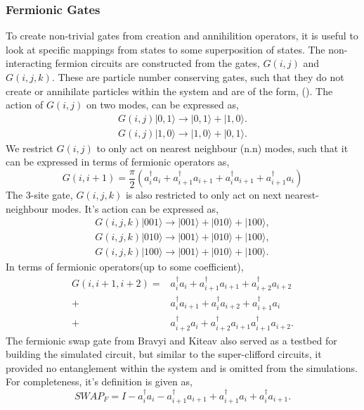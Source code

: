 \subsubsection{Fermionic Gates}
To create non-trivial gates from creation and annihilition operators, it is useful to look at specific mappings from states to some superposition of states. 
The non-interacting fermion circuits are constructed from the gates, $G(i, j)$ and $G(i, j, k)$. These are particle number conserving gates, such that they do not create or annihilate particles within the system and are of the form, (). The action of $G(i, j)$ on two modes, can be expressed as, 
\begin{align*}
    G(i, j) |0, 1 \rangle \to |0, 1\rangle + |1, 0\rangle. \\
    G(i, j) |1, 0 \rangle \to |1, 0\rangle + |0, 1\rangle.
\end{align*}
We restrict $G(i, j)$ to only act on nearest neighbour (n.n) modes, such that it can be expressed in terms of fermionic operators as,
\begin{equation}
    G(i, i+1) = \frac{\pi}{2}(a^{\dagger}_{i}a_{i} + a^{\dagger}_{i+1}a_{i+1} + a^{\dagger}_{i}a_{i+1} + a^{\dagger}_{i+1}a_{i})
\end{equation}
The 3-site gate, $G(i, j, k)$ is also restricted to only act on next nearest-neighbour modes. It's action can be expressed as, 
\begin{align*}
    G(i, j, k) |001\rangle\to |001\rangle + | 010\rangle + |100\rangle, \\
    G(i, j, k) |010\rangle\to |001\rangle + | 010\rangle + |100\rangle, \\
    G(i, j, k) |100\rangle\to |001\rangle + | 010\rangle + |100\rangle.
\end{align*}
In terms of fermionic operators(up to some coefficient), 
\begin{align*}
    G(i, i+1, i+2) = &a^{\dagger}_{i}a_{i} + a^{\dagger}_{i+1}a_{i+1} + a^{\dagger}_{i+2}a_{i+2} \\
    + &a^{\dagger}_{i}a_{i+1} +  a^{\dagger}_{i}a_{i+2} + a^{\dagger}_{i+1}a_{i}\\  + & a^{\dagger}_{i+2}a_{i} + a^{\dagger}_{i+2}a_{i+1} a^{\dagger}_{i+1}a_{i+2}. 
\end{align*}
The fermionic swap gate from Bravyi and Kiteav \cite{Bravyi2000} also served as a testbed for building the simulated circuit, but similar to the super-clifford circuits, it provided no entanglement within the system and is omitted from the simulations. For completeness, it's definition is given as, 
\begin{equation}
    SWAP_{F} = I - a^{\dagger}_{i}a_{i} - a^{\dagger}_{i+1}a_{i+1} + a^{\dagger}_{i+1}a_{i} + a^{\dagger}_{i}a_{i+1}.
\end{equation}


